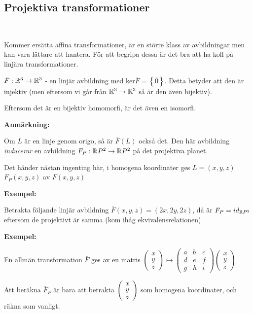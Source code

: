 \subsection{Projektiva transformationer}\hfill\\\par
\noindent Kommer ersätta affina transformationer, är en större klass av avbildningar men kan vara lättare att hantera. För att begripa dessa är det bra att ha koll på linjära transformationer.
\par\bigskip
\noindent $\bar{F}:\mathbb{R}^3\to\mathbb{R}^3$ - en linjär avbildning med ker$\bar{F} = \left\{\bar{0}\right\}$. Detta betyder att den är injektiv (men eftersom vi går från $\mathbb{R}^3\to\mathbb{R}^3$ så är den även bijektiv).
\par\bigskip
\noindent Eftersom det är en bijektiv homomorfi, är det även en isomorfi.
\par\bigskip
\noindent\textbf{Anmärkning:}\par
\noindent Om $L$ är en linje genom origo, så är $\bar{F}(L)$ också det. Den här avbildning \textit{inducerar} en avbildning $F_P:\mathbb{R} P^2\to\mathbb{R} P^2$ på det projektiva planet.\par
\noindent Det händer nästan ingenting här, i homogena koordinater ges $L=(x,y,z)$ $F_P(x,y,z)$ av $F(x,y,z)$
\par\bigskip
\noindent\textbf{Exempel:}\par
\noindent Betrakta följande linjär avbildning $\bar{F}(x,y,z) = (2x,2y,2z)$, då är $F_P = id_{\mathbb{R} P^2}$ eftersom de projektivt är samma (kom ihåg ekvivalensrelationen)
\par\bigskip
\noindent\textbf{Exempel:}\par
\noindent En allmän transformation $\bar{F}$ ges av en matris $\begin{pmatrix}x\\y\\z\end{pmatrix}\mapsto\begin{pmatrix}a&b&c\\d&e&f\\g&h&i\end{pmatrix}\begin{pmatrix}x\\y\\z\end{pmatrix}$\par
\noindent Att beräkna $\bar{F}_P$ är bara att betrakta $\begin{pmatrix}x\\y\\z\end{pmatrix}$ som homogena koordinater, och räkna som vanligt.
